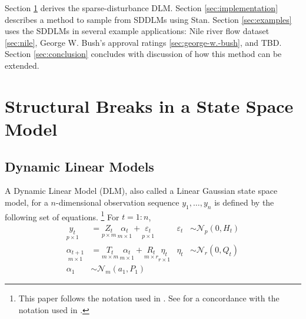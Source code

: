 \documentclass{article}
\newcommand{\dist}[1]{\mathcal{#1}}
\newcommand{\paren}[1]{\ensuremath{\left(#1\right)}}
\newcommand{\dmvnorm}[2]{\ensuremath{\dist{N}_{#2}\paren{#1}}}
\begin{document}
Section \ref{sec:struct-breaks-state} derives the sparse-disturbance DLM.
Section \ref{sec:implementation} describes a method to sample from SDDLMs using Stan.
Section \ref{sec:examples} uses the SDDLMs in several example applications: Nile river flow dataset \ref{sec:nile}, George W. Bush's approval ratings \ref{sec:george-w.-bush}, and TBD.
Section \ref{sec:conclusion} concludes with discussion of how this method can be extended.

\section{Structural Breaks in a State Space Model}
\label{sec:struct-breaks-state}

\subsection{Dynamic Linear Models}
\label{sec:dynam-line-models}

A Dynamic Linear Model (DLM), also called a Linear Gaussian state space model, for a $n$-dimensional observation sequence $y_{1}, \dots, y_{n}$ is defined by the following set of equations.%
\footnote{This paper follows the notation used in \textcite{DurbinKoopman2001}. See \textcite{PetrisPetroneEtAl2009} for a concordance with the notation used in \textcite{WestHarrison1997}.}
For $t = 1:n$,
\begin{align}
  \label{eq:8}
  \underset{p \times 1}{y_t} &= \underset{p \times m}{Z_{t}} \, \underset{m \times 1}{\alpha_t} + \underset{p \times 1}{\varepsilon_t} & \varepsilon_{t} &\sim \dmvnorm{0, H_{t}}{p} \\
  \label{eq:14}
  \underset{m \times 1}{\alpha_{t+1}} &= \underset{m \times m}{T_{t}} \, \underset{m \times 1}{\alpha_{t}} + \underset{m \times r}{R_{t}}  \underset{r \times 1}{\eta_{t}} & \eta_{t} &\sim \dmvnorm{0, Q_{t}}{r} \\
  \label{eq:2}
  \alpha_{1} & \sim \dmvnorm{a_{1}, P_{1}}{m}
\end{align}
\end{document}
